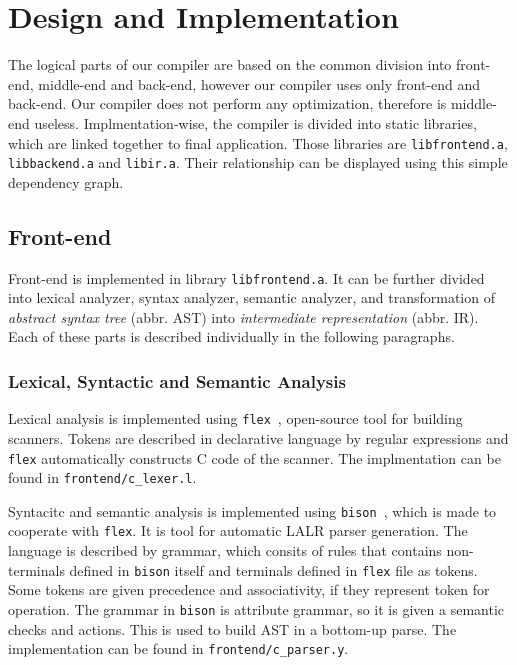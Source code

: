\documentclass[12pt]{article}
\begin{document}
\section{Design and Implementation}
The logical parts of our compiler are based on the common division into front-end, middle-end and back-end, however our compiler uses only front-end and back-end.
Our compiler does not perform any optimization, therefore is middle-end useless.
Implmentation-wise, the compiler is divided into static libraries, which are linked together to final application.
Those libraries are \texttt{libfrontend.a}, \texttt{libbackend.a} and \texttt{libir.a}. Their relationship can be displayed using this simple dependency graph.
\begin{figure}[!h]
	\centering
\end{figure}
\subsection{Front-end}
Front-end is implemented in library \texttt{libfrontend.a}. It can be further divided into lexical analyzer, syntax analyzer, semantic analyzer,
and transformation of \emph{abstract syntax tree} (abbr. AST) into
\emph{intermediate representation} (abbr. IR). Each of these parts is described individually in the following paragraphs.

\subsubsection{Lexical, Syntactic and Semantic Analysis}
Lexical analysis is implemented using \texttt{flex}~\cite{flex}, open-source tool for building scanners. Tokens are described in declarative language
by regular expressions and \texttt{flex} automatically constructs C code of the scanner.
The implmentation can be found in \texttt{frontend/c\_lexer.l}.

Syntacitc and semantic analysis is implemented using \texttt{bison}~\cite{bison}, which is made to cooperate with \texttt{flex}. It is tool
for automatic LALR parser generation. The language is described by grammar, which consits of rules that contains non-terminals defined in \texttt{bison} itself
and terminals defined in \texttt{flex} file as tokens. Some tokens are given precedence and associativity, if they represent token for operation.
The grammar in \texttt{bison} is attribute grammar, so it is given a semantic checks and actions. This is used to build AST in a bottom-up parse.
The implementation can be found in \texttt{frontend/c\_parser.y}.
\end{document}
